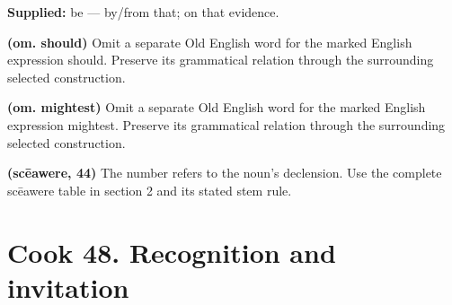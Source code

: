 \textbf{Supplied:} be — by/\allowbreak{}from that; on that evidence.

\textbf{(om. should)} Omit a separate Old English word for the marked English expression should. Preserve its grammatical relation through the surrounding selected construction.

\textbf{(om. mightest)} Omit a separate Old English word for the marked English expression mightest. Preserve its grammatical relation through the surrounding selected construction.

\textbf{(scēawere, 44)} The number refers to the noun’s declension. Use the complete scēawere table in section 2 and its stated stem rule.

\section*{Cook 48. Recognition and invitation}

